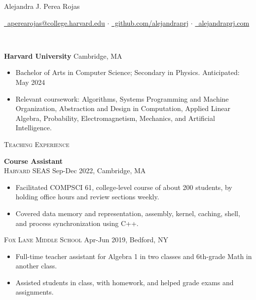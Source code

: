 \documentclass[11pt]{article}
\begin{document}
  \centerline{\Large{Alejandra J. Perea Rojas}}\vspace{1mm}

  \centerline{
    \href{mailto:aperearojas@college.harvard.edu}{\faEnvelopeO~aperearojas@college.harvard.edu} 
    $\cdot$ \href{https://github.com/alejandraprj}{\faGithub~github.com/alejandraprj}
    $\cdot$ \href{https://alejandraprj.com}{\faGlobe~alejandraprj.com}
  }\vspace{2mm}

  \vspace{-7pt}\\
  \noindent\makebox[\linewidth]{\rule{7.5in}{0.3pt}}

  \noindent \textbf{Harvard University} \hfill Cambridge, MA
    \begin{itemize}[itemsep=-.4em, leftmargin=1em]\vspace{-2mm}
        \item Bachelor of Arts in Computer Science; Secondary in Physics. \hfill Anticipated: May 2024
        \item Relevant coursework: 
          Algorithms, 
          Systems Programming and Machine Organization,
          Abstraction and Design in Computation, 
          Applied Linear Algebra, Probability,
          Electromagnetism, Mechanics, 
          and Artificial Intelligence.
    \end{itemize}

  \noindent\textsc{\large Teaching Experience}\vspace{-7pt}\\
  \noindent\makebox[\linewidth]{\rule{7.5in}{0.3pt}}
   
   \noindent\textbf{Course Assistant} \\
   \textsc{Harvard SEAS} \hfill Sep-Dec 2022, Cambridge, MA
   \begin{itemize}[itemsep=-.4em, leftmargin=1em]\vspace{-2mm}
     \item Facilitated COMPSCI 61, college-level course of about 200 students, by holding office hours and review sections weekly.
     \item Covered data memory and representation, assembly, kernel, caching, shell, and process synchronization using C++.
   \end{itemize}\vspace{-1mm}
   \textsc{Fox Lane Middle School} \hfill Apr-Jun 2019, Bedford, NY
   \begin{itemize}[itemsep=-.4em, leftmargin=1em]\vspace{-2mm}
     \item Full-time teacher assistant for Algebra 1 in two classes and 6th-grade Math in another class. 
     \item Assisted students in class, with homework, and helped grade exams and assignments.
   \end{itemize}
\end{document}
